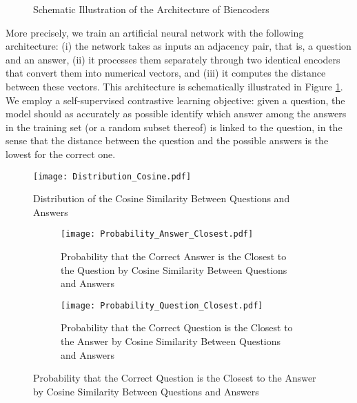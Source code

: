 {{\begin{figure}[!p]
    \centering
    \caption{Schematic Illustration of the Architecture of Biencoders}
    \label{fig:biencoders}
\end{figure}

More precisely, we train an artificial neural network with the following architecture: (i) the network takes as inputs an adjacency pair, that is, a question and an answer, (ii) it processes them separately through two identical encoders that convert them into numerical vectors, and (iii) it computes the distance between these vectors. This architecture is schematically illustrated in Figure \ref{fig:biencoders}. We employ a self-supervised contrastive learning objective: given a question, the model should as accurately as possible identify which answer among the answers in the training set (or a random subset thereof) is linked to the question, in the sense that the distance between the question and the possible answers is the lowest for the correct one.

\begin{figure}[!p]
    \centering
    \texttt{[image: Distribution\_Cosine.pdf]}
    \caption{Distribution of the Cosine Similarity Between Questions and Answers}
    \label{fig:distribution}
\end{figure}

\begin{figure}[!p]
    \centering
    \begin{subfigure}[t]{0.475\textwidth}
        \centering
        \texttt{[image: Probability\_Answer\_Closest.pdf]}
        \caption{Probability that the Correct Answer is the Closest to the Question by Cosine Similarity Between Questions and Answers}
    \end{subfigure}    \hfill
    \begin{subfigure}[t]{0.475\textwidth}
        \centering
        \texttt{[image: Probability\_Question\_Closest.pdf]}
        \caption{Probability that the Correct Question is the Closest to the Answer by Cosine Similarity Between Questions and Answers}
    \end{subfigure}
    

\end{figure}}}
